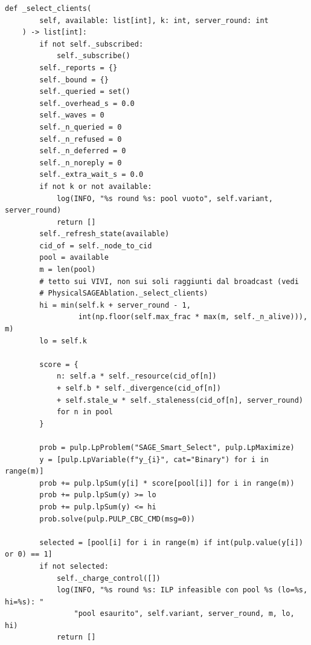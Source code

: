 \documentclass[11pt,a4paper]{article}
\begin{document}
\begin{lstlisting}[style=py,firstnumber=553,caption={\texttt{tesifl/strategies/sage\_smart.py}, lines 553--643}]
    def _select_clients(
        self, available: list[int], k: int, server_round: int
    ) -> list[int]:
        if not self._subscribed:
            self._subscribe()
        self._reports = {}
        self._bound = {}
        self._queried = set()
        self._overhead_s = 0.0
        self._waves = 0
        self._n_queried = 0
        self._n_refused = 0
        self._n_deferred = 0
        self._n_noreply = 0
        self._extra_wait_s = 0.0
        if not k or not available:
            log(INFO, "%s round %s: pool vuoto", self.variant, server_round)
            return []
        self._refresh_state(available)
        cid_of = self._node_to_cid
        pool = available
        m = len(pool)
        # tetto sui VIVI, non sui soli raggiunti dal broadcast (vedi
        # PhysicalSAGEAblation._select_clients)
        hi = min(self.k + server_round - 1,
                 int(np.floor(self.max_frac * max(m, self._n_alive))), m)
        lo = self.k

        score = {
            n: self.a * self._resource(cid_of[n])
            + self.b * self._divergence(cid_of[n])
            + self.stale_w * self._staleness(cid_of[n], server_round)
            for n in pool
        }

        prob = pulp.LpProblem("SAGE_Smart_Select", pulp.LpMaximize)
        y = [pulp.LpVariable(f"y_{i}", cat="Binary") for i in range(m)]
        prob += pulp.lpSum(y[i] * score[pool[i]] for i in range(m))
        prob += pulp.lpSum(y) >= lo
        prob += pulp.lpSum(y) <= hi
        prob.solve(pulp.PULP_CBC_CMD(msg=0))

        selected = [pool[i] for i in range(m) if int(pulp.value(y[i]) or 0) == 1]
        if not selected:
            self._charge_control([])
            log(INFO, "%s round %s: ILP infeasible con pool %s (lo=%s, hi=%s): "
                "pool esaurito", self.variant, server_round, m, lo, hi)
            return []


\end{lstlisting}
\end{document}
